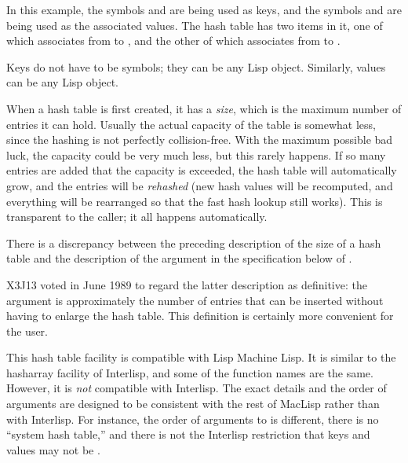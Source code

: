 In this example, the symbols  and  are being used as
keys, and the symbols  and  are being used as the
associated values.  The hash table has two items in it, one of which
associates from  to , and the other of which
associates from  to .

Keys do not have to be symbols; they can be any Lisp object.  Similarly,
values can be any Lisp object.

\begin{obsolete}
When a hash table is first created, it has a \emph{size}, which is the
maximum number of entries it can hold.  Usually the actual capacity of
the table is somewhat less, since the hashing is not perfectly
collision-free.  With the maximum possible bad luck, the capacity could
be very much less, but this rarely happens.  If so many entries are
added that the capacity is exceeded, the hash table will automatically
grow, and the entries will be \emph{rehashed} (new hash values will be
recomputed, and everything will be rearranged so that the fast hash
lookup still works).  This is transparent to the caller; it all happens
automatically.
\end{obsolete}

\begin{newer}
There is a discrepancy between the preceding description of the
size of a hash table and the description of the  argument
in the specification below
of .

X3J13 voted in June 1989  to regard the
latter description as definitive: the  argument
is approximately the number of entries that can be inserted
without having to enlarge the hash table.  This definition is certainly
more convenient for the user.
\end{newer}

\beforenoterule
\begin{incompatibility}
This hash table facility is compatible with Lisp Machine Lisp.  It
is similar to the hasharray facility of Interlisp, and some of the
function names are the same.  However, it is \emph{not} compatible with
Interlisp.  The exact details and the order of arguments are designed to
be consistent with the rest of MacLisp rather than with
Interlisp.  For instance, the order of arguments to  is
different, there is no ``system hash table,'' and there is not
the Interlisp restriction that keys and values may not be {\false}.
\end{incompatibility}
\afternoterule

